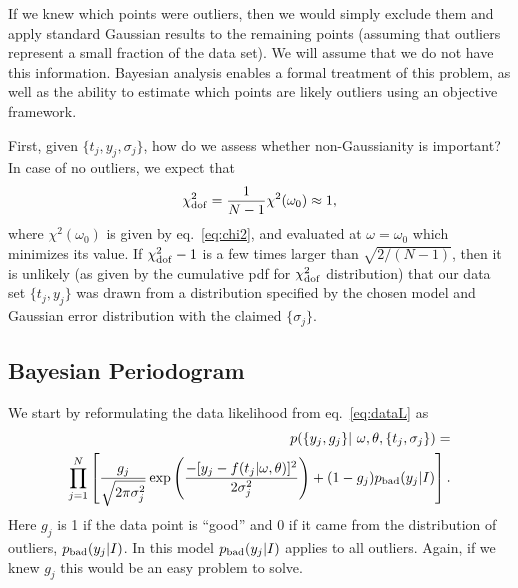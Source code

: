 \documentclass[12pt,pdftex]{article}
\begin{document}
If we knew which points were outliers, then we would simply exclude them and
apply standard Gaussian results to the remaining points (assuming that outliers
represent a small fraction of the data set). We will assume that we do not have this
information. Bayesian analysis enables a formal treatment of this problem, as well 
as the ability to estimate which points are likely outliers using an objective framework.

First, given $\{t_j, y_j, \sigma_j\}$, how do we assess whether non-Gaussianity is important? 
In case of no outliers, we expect that
\begin{equation}
           \chi^2_{\rm dof} = {1 \over N-1} \chi^2(\omega_0) \approx 1,
\end{equation}
where $\chi^2(\omega_0)$ is given by eq.~\ref{eq:chi2}, and evaluated at $\omega=\omega_0$ which
minimizes its value. If $\chi^2_{\rm dof}-1$ is a few times larger than $\sqrt{2/(N-1)}$, then it is unlikely
(as given by the cumulative pdf for $\chi^2_{\rm dof}$ distribution) that our data set $\{t_j, y_j\}$ was 
drawn from a distribution specified by the chosen model and Gaussian error distribution with 
the claimed $\{\sigma_j\}$.


\subsection{Bayesian Periodogram} 

We start by reformulating the data likelihood from eq.~\ref{eq:dataL}  as
\begin{eqnarray}
\label{eq:dataL2} 
    p(\{y_j, g_j\} |~\omega, \theta, \{t_j, \sigma_j\}) = \nonumber \\ 
  \prod_{j=1}^{N} \left[ \frac{g_j}{\sqrt{2\pi\sigma_j^2}} \exp\left(
  \frac{-[y_j - f(t_j|\omega, \theta)]^2}{2\sigma_j^2}\right) + 
       (1-g_j) p_{\rm bad}(y_j|I) \right].
\end{eqnarray}  
Here $g_j$ is 1 if the data point is ``good'' and 0 if it came from the distribution
of outliers, $p_{\rm bad}(y_j|I)$. In this model $p_{\rm bad}(y_j|I)$ applies to all
outliers. Again, if we knew $g_j$ this would be an easy problem to solve.
\end{document}

